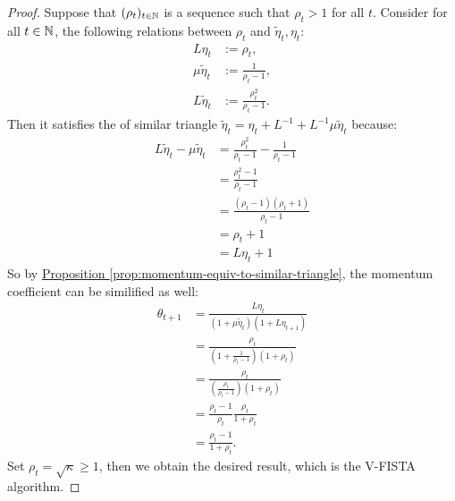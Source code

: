\documentclass[12pt]{article}
\begin{document}
        \begin{proof}
            Suppose that $(\rho_t)_{t \in \mathbb N}$ is a sequence such that $\rho_t > 1$ for all $t$. 
            Consider for all $t \in \mathbb N$, the following relations between $\rho_t$ and $\tilde \eta_t, \eta_t$: 
            \begin{align*}
                L \eta_t &:= \rho_t, 
                \\
                \mu \tilde \eta_t &:= \frac{1}{\rho_t - 1}, 
                \\
                L \tilde \eta_t &:= \frac{\rho_t^2}{\rho_t - 1}. 
            \end{align*}
            Then it satisfies the of similar triangle $\tilde \eta_t = \eta_t + L^{-1} + L^{-1} \mu \tilde \eta_t$ because: 
            \begin{align*}
                L \tilde \eta_t - \mu \tilde \eta_t 
                &= \frac{\rho_t^2}{\rho_t - 1} - \frac{1}{\rho_t - 1}
                \\
                &= \frac{\rho_t^2 - 1}{\rho_t - 1} 
                \\
                &= \frac{(\rho_t - 1)(\rho_t + 1)}{\rho_t - 1} 
                \\
                &= \rho_t + 1
                \\
                &= L\eta_t + 1
            \end{align*}
            So by 
            \hyperref[prop:momentum-equiv-to-similar-triangle]{Proposition \ref*{prop:momentum-equiv-to-similar-triangle}}, 
            the momentum coefficient can be similified as well: 
            \begin{align*}
                \theta_{t + 1} 
                &= \frac{L\eta_t}{(1 + \mu \tilde\eta_{t})(1 + L\eta_{t + 1})}
                \\
                &= \frac{\rho_t}{
                    \left(
                        1 + \frac{1}{\rho_t - 1}
                    \right)
                    (1 + \rho_t)
                }
                \\
                &= \frac{\rho_t}{
                    \left(
                    \frac{\rho_t}{\rho_t - 1}
                    \right)
                    (1 + \rho_t)
                }
                \\
                &= 
                \frac{\rho_t - 1}{\rho_t}
                \frac{\rho_t}{1 + \rho_t}
                \\
                &= \frac{\rho_t - 1}{1 + \rho_t}. 
            \end{align*}
            Set $\rho_t = \sqrt{\kappa} \ge 1$, then we obtain the desired result, which is the V-FISTA algorithm. 
        \end{proof}
\end{document}
